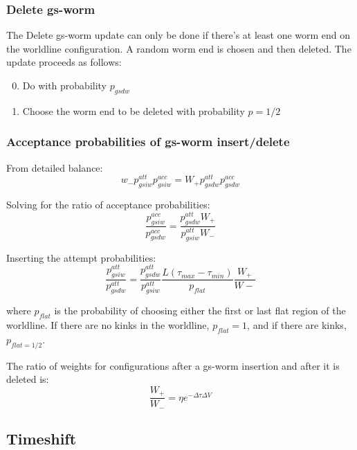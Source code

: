\documentclass[12pt, two sided]{article}
\begin{document}
    \subsubsection{Delete gs-worm}
    The Delete gs-worm update can only be done if there's at least one worm end on the worldline configuration. A random worm end is chosen and then deleted. The update proceeds as follows:
    \begin{enumerate}
        \setcounter{enumi}{-1}
    \item Do with probability $p_{gsdw}$
    \item Choose the worm end to be deleted with probability $p=1/2$
    \end{enumerate}

    \subsubsection{Acceptance probabilities of gs-worm insert/delete}

    From detailed balance:
    \begin{equation}
        w_- p_{gsiw}^{att} p_{gsiw}^{acc} = W_+ p_{gsdw}^{att} p_{gsdw}^{acc}
    \end{equation}

    Solving for the ratio of acceptance probabilities:
    \begin{equation}
        \frac{p_{gsiw}^{acc}}{p_{gsdw}^{acc}} = \frac{p_{gsdw}^{att} W_+}{p_{gsiw}^{att} W_-}  
    \end{equation}

    Inserting the attempt probabilities:
    \begin{equation}
        \frac{p_{gsiw}^{att}}{p_{gsdw}^{att}} = \frac{p_{gsdw}^{att}}{p_{gsiw}^{att}} \frac{L(\tau_{max}-\tau_{min})}{p_{flat}} \frac{W_+}{W-}
    \end{equation}

    where $p_{flat}$ is the probability of choosing either the first or last flat region of the worldline. If there are no kinks in the worldline, $p_{flat}=1$, and if there are kinks, $p_{flat=1/2}$.


    The ratio of weights for configurations after a gs-worm insertion and after it is deleted is:
    \begin{equation}
        \frac{W_+}{W_-} = \eta e^{-\Delta \tau \Delta V}
    \end{equation}

	\subsection{Timeshift}
\end{document}
